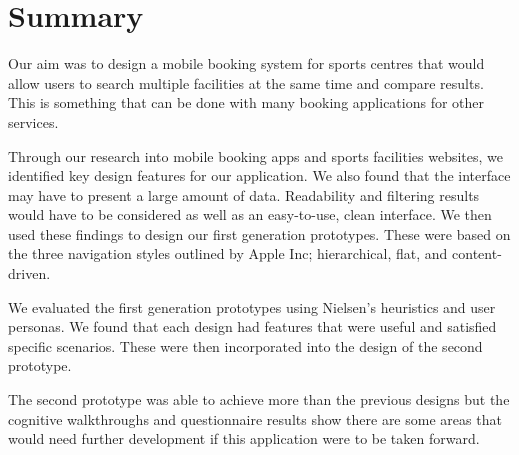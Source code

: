 \section{Summary}
\label{sec:summary}

Our aim was to design a mobile booking system for sports centres that would
allow users to search multiple facilities at the same time and compare results.
This is something that can be done with many booking applications for other
services.

Through our research into mobile booking apps and sports facilities websites,
we identified key design features for our application. We also found that the
interface may have to present a large amount of data. Readability and filtering
results would have to be considered as well as an easy-to-use, clean interface.
We then used these findings to design our first generation prototypes. These
were based on the three navigation styles outlined by Apple Inc; hierarchical,
flat, and content-driven.

We evaluated the first generation prototypes using Nielsen’s heuristics and
user personas. We found that each design had features that were useful and
satisfied specific scenarios. These were then incorporated into the design of
the second prototype.

The second prototype was able to achieve more than the previous designs but the
cognitive walkthroughs and questionnaire results show there are some areas that
would need further development if this application were to be taken forward.

